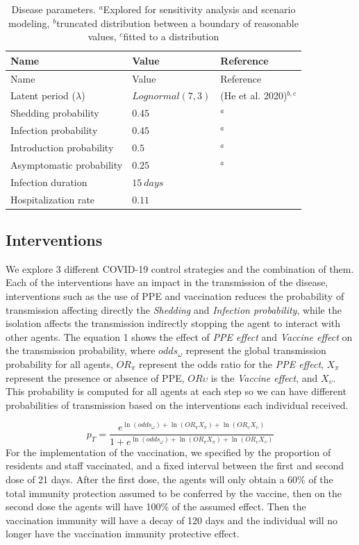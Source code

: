 \documentclass[
]{article}
\begin{document}
\begin{longtable}[]{@{}lll@{}}
\caption{Disease parameters. \(^a\)Explored for sensitivity analysis and
scenario modeling, \(^b\)truncated distribution between a boundary of
reasonable values, \(^c\)fitted to a distribution}\tabularnewline
\toprule
Name & Value & Reference\tabularnewline
\midrule
\endfirsthead
\toprule
Name & Value & Reference\tabularnewline
\midrule
\endhead
Latent period (\(\lambda\)) & \(Lognormal(7, 3)\) & (He et al.
2020)\(^{b,c}\)\tabularnewline
Shedding probability & \(0.45\) & \(^a\)\tabularnewline
Infection probability & \(0.45\) & \(^a\)\tabularnewline
Introduction probability & \(0.5\) & \(^a\)\tabularnewline
Asymptomatic probability & \(0.25\) & \(^a\)\tabularnewline
Infection duration & \(15\ days\) &\tabularnewline
Hospitalization rate & \(0.11\) &\tabularnewline
\bottomrule
\end{longtable}

\hypertarget{interventions}{%
\subsection{Interventions}\label{interventions}}

We explore 3 different COVID-19 control strategies and the combination
of them. Each of the interventions have an impact in the transmission of
the disease, interventions such as the use of PPE and vaccination
reduces the probability of transmission affecting directly the
\emph{Shedding} and \emph{Infection probability}, while the isolation
affects the transmission indirectly stopping the agent to interact with
other agents. The equation 1 shows the effect of \emph{PPE effect} and
\emph{Vaccine effect} on the transmission probability, where
\(odds_\omega\) represent the global transmission probability for all
agents, \(OR_\pi\) represent the odds ratio for the \emph{PPE effect},
\(X_\pi\) represent the presence or absence of PPE, \(OR\upsilon\) is
the \emph{Vaccine effect}, and \(X_\upsilon\). This probability is
computed for all agents at each step so we can have different
probabilities of transmission based on the interventions each individual
received.

\[p_T = \frac{e^{\ln(odds_\omega) + \ln(OR_\pi X_\pi)+ \ln(OR_\upsilon X_\upsilon)}}{1 + e^{\ln(odds_\omega) + \ln(OR_\pi X_\pi)+ \ln(OR_\upsilon  X_\upsilon)}}\]
For the implementation of the vaccination, we specified by the
proportion of residents and staff vaccinated, and a fixed interval
between the first and second dose of 21 days. After the first dose, the
agents will only obtain a 60\% of the total immunity protection assumed
to be conferred by the vaccine, then on the second dose the agents will
have 100\% of the assumed effect. Then the vaccination immunity will
have a decay of 120 days and the individual will no longer have the
vaccination immunity protective effect.
\end{document}
